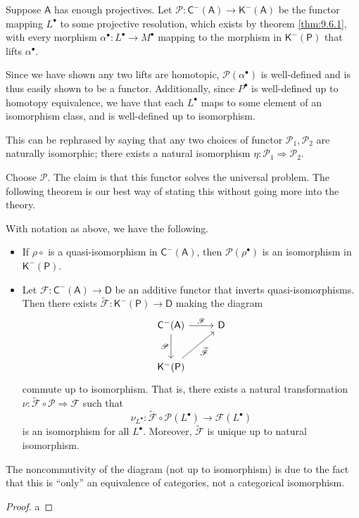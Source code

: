 Suppose $\mathsf{A} $ has enough projectives. Let $\mathscr{P} : \mathsf{C} ^{-} (\mathsf{A} ) \to \mathsf{K} ^{-} (\mathsf{A} )$ be the functor mapping $L^{\bullet} $ to some projective resolution, which exists by theorem \ref{thm:9.6.1}, with every morphism $\alpha ^{\bullet} : L^{\bullet}  \to M^{\bullet} $ mapping to the morphism in $\mathsf{K} ^{-} (\mathsf{P}) $ that lifts $\alpha ^{\bullet} $.

Since we have shown any two lifts are homotopic, $\mathscr{P} (\alpha ^{\bullet} )$ is well-defined and is thus easily shown to be a functor. Additionally, since $P^{\bullet} $ is well-defined up to homotopy equivalence, we have that each $L^{\bullet} $ maps to some element of an isomorphism class, and is well-defined up to isomorphism.

This can be rephrased by saying that any two choices of functor $\mathscr{P} _1,\mathscr{P} _2$ are naturally isomorphic; there exists a natural isomorphism $\eta : \mathscr{P} _1 \Rightarrow \mathscr{P} _2$.

Choose $\mathscr{P} $. The claim is that this functor solves the universal problem. The following theorem is our best way of stating this without going more into the theory.
\begin{theorem}\label{thm:9.6.3}
	With notation as above, we have the following.
	\begin{itemize}
		\item If $\rho \circ $ is a quasi-isomorphism in $\mathsf{C} ^{-} (\mathsf{A} )$, then $\mathscr{P} (\rho ^{\bullet} )$ is an isomorphism in $\mathsf{K}^{-} (\mathsf{P} )$.
		\item Let $\mathscr{F} : \mathsf{C} ^{-} (\mathsf{A} ) \to \mathsf{D} $ be an additive functor that inverts quasi-isomorphisms. Then there exists $\widetilde{\mathscr{F} } : \mathsf{K} ^{-} (\mathsf{P} ) \to \mathsf{D} $ making the diagram
			\[\begin{tikzcd}[row sep = 2.5em, column sep = 2.5em]
				\mathsf{C} ^{-} (\mathsf{A} )\ar[r, "\mathscr{F} "]\ar[d, "\mathscr{P} "']&\mathsf{D} \\
				\mathsf{K} ^{-} (\mathsf{P} )\ar[ur, "\widetilde{\mathscr{F}} "']
			\end{tikzcd}\]
			commute up to isomorphism. That is, there exists a natural transformation $\nu : \widetilde{\mathscr{F} } \circ \mathscr{P}  \Rightarrow \mathscr{F} $ such that
			\[
				\nu_{L^{\bullet} } : \widetilde{\mathscr{F} } \circ \mathscr{P}(L^{\bullet} )  \to \mathscr{F} (L^{\bullet} )
			\]
			is an isomorphism for all $L^{\bullet} $. Moreover, $\widetilde{\mathscr{F} } $ is unique up to natural isomorphism.
	\end{itemize}
\end{theorem}
The noncommutivity of the diagram (not up to isomorphism) is due to the fact that this is ``only'' an equivalence of categories, not a categorical isomorphism.
\begin{proof}
	a
\end{proof}

